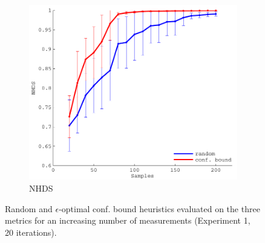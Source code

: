 \documentclass[11pt]{article} %
\begin{document}
\begin{figure}[tb]
  \hfill
  \begin{subfigure}[b]{0.329\textwidth}
    \centering
    \includegraphics[width=\textwidth]{figures/sin2d_eps_hd}
    \caption{NHDS}
  \end{subfigure}
  \caption{Random and $\epsilon$-optimal conf. bound heuristics evaluated
           on the three metrics for an increasing number of measurements
           (Experiment 1, 20 iterations).}
  \label{fig:sin2d_eval_eps}
\end{figure}
\end{document}
